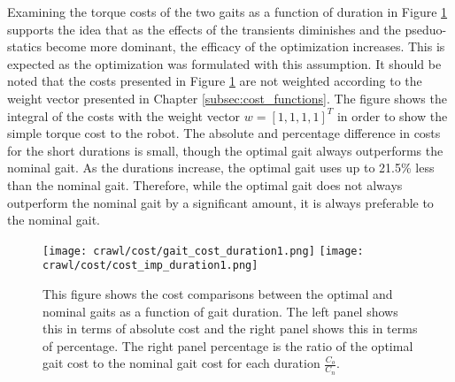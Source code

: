 Examining the torque costs of the two gaits as a function of duration
in Figure \ref{fig:cost_duration1} supports
the idea that as the effects of the transients diminishes and the pseduo-statics
become more dominant, the efficacy of the optimization increases.
This is expected as the optimization was formulated with this assumption. 
It should be noted that the costs presented in Figure \ref{fig:cost_duration1}
are not weighted according to the weight vector presented in Chapter \ref{subsec:cost_functions}.
The figure shows the integral of the costs with the weight vector $w = [1, 1, 1, 1]^T$
in order to show the simple torque cost to the robot. 
The absolute and percentage difference in costs for the short durations is small,
though the optimal gait always outperforms the nominal gait.
As the durations increase, the optimal gait uses up to 21.5\% less than the
nominal gait. Therefore, while the optimal gait does not always outperform the
nominal gait by a significant amount, it is always preferable to the nominal gait.

\begin{figure}
  \texttt{[image: crawl/cost/gait\_cost\_duration1.png]}
  \texttt{[image: crawl/cost/cost\_imp\_duration1.png]}
  \caption{This figure shows the cost comparisons between the optimal and
           nominal gaits as a function of gait duration. The left panel shows
           this in terms of absolute cost and the right panel shows this in 
           terms of percentage. The right panel percentage is the ratio of the optimal
           gait cost to the nominal gait cost for each duration $\frac{C_o}{C_n}$.}
  \label{fig:cost_duration1}
\end{figure}


